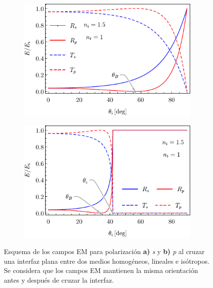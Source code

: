 	
\begin{figure}[t!]\centering
	\begin{subfigure}{.05\textwidth}\vspace{-4.75cm}\caption{}\label{sfig:frsnelExt}\end{subfigure}
	\begin{subfigure}{.43\textwidth} \hspace*{-1cm}
	\includegraphics[scale=1,trim={00 00 00 00}, clip]{1-Teoria/figs/0-FrsnelExt}
	\end{subfigure}
	\begin{subfigure}{.05\textwidth}\vspace{-4.75cm}\caption{}\label{sfig:frsenlInt}\end{subfigure}
	\begin{subfigure}{.43\textwidth} \hspace*{-.9cm}
	\includegraphics[scale=1,trim={00 00 00 00 }, clip]{1-Teoria/figs/0-FrsnelInt}
	\end{subfigure}\vspace*{-.7em}
	\caption{ Esquema de los campos EM para polarización \textbf{a)} \emph{s} y \textbf{b)} \emph{p} al cruzar una interfaz plana entre dos medios homogéneos, lineales e isótropos. Se considera que los campos EM mantienen la misma orientación antes y después de cruzar la interfaz.}	\label{fig:frsnel}	
	\end{figure}	

